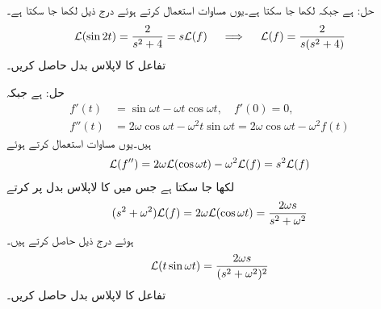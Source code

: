حل: ہے جبکہ  لکھا جا سکتا ہے۔یوں مساوات  استعمال کرتے ہوئے درج ذیل لکھا جا سکتا ہے۔ 
\begin{align*}
\mathcal{L}(\sin 2t)=\frac{2}{s^2+4}=s\mathcal{L}(f) \quad \implies \quad \mathcal{L}(f)=\frac{2}{s(s^2+4)}
\end{align*}
تفاعل  کا لاپلاس بدل حاصل کریں۔

حل: ہے جبکہ
\begin{align*}
f'(t)&=\sin \omega t-\omega t\cos \omega t, \quad f'(0)=0,\\
f''(t)&=2\omega \cos \omega t-\omega^2 t \sin \omega t=2\omega \cos \omega t-\omega^2 f(t)
\end{align*}
ہیں۔یوں مساوات  استعمال کرتے ہوئے
\begin{align*}
\mathcal{L}(f'')=2\omega \mathcal{L}(\cos \omega t)-\omega^2\mathcal{L}(f)=s^2\mathcal{L}(f)
\end{align*}
لکھا جا سکتا ہے جس میں  کا لاپلاس بدل پر کرتے 
\begin{align*}
(s^2+\omega^2)\mathcal{L}(f)=2\omega \mathcal{L}(\cos \omega t)=\frac{2\omega s}{s^2+\omega^2}
\end{align*}
ہوئے درج ذیل حاصل کرتے ہیں۔
\begin{align*}
\mathcal{L}(t\sin \omega t)=\frac{2\omega s}{(s^2+\omega^2)^2}
\end{align*}
تفاعل  کا لاپلاس بدل حاصل کریں۔

